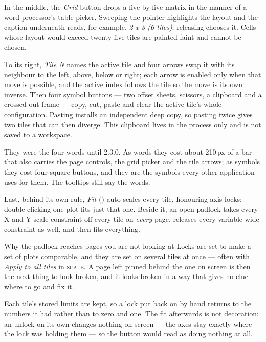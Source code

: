 \documentclass[11pt,a4paper,oneside]{report}
\newcommand{\key}[1]{\textsf{\small\fbox{#1}}}
\newcommand{\tab}[1]{\textsc{#1}}
\begin{document}
In the middle, the \emph{Grid} button drops a five-by-five matrix in the manner
of a word processor's table picker. Sweeping the pointer highlights the layout
and the caption underneath reads, for example, \emph{2 x 3 (6 tiles)}; releasing
chooses it. Cells whose layout would exceed twenty-five tiles are painted faint
and cannot be chosen.

To its right, \emph{Tile N} names the active tile and four arrows swap it with
its neighbour to the left, above, below or right; each arrow is enabled only when
that move is possible, and the active index follows the tile so the move is its
own inverse. Then four symbol buttons --- two offset sheets, scissors, a
clipboard and a crossed-out frame --- copy, cut, paste and clear the active
tile's whole configuration. Pasting installs an independent deep copy, so
pasting twice gives two tiles that can then diverge. This clipboard lives in
the process only and is not saved to a workspace.

They were the four words until 2.3.0. As words they cost about 210\,px of a bar
that also carries the page controls, the grid picker and the tile arrows; as
symbols they cost four square buttons, and they are the symbols every other
application uses for them. The tooltips still say the words.

Last, behind its own rule, \emph{Fit} (\key{Ctrl+0}) auto-scales every tile,
honouring axis locks; double-clicking one plot fits just that one. Beside it, an
open padlock takes every X and Y scale constraint off every tile on
\emph{every} page, releases every variable-wide constraint as well, and then
fits everything.

\begin{aoenote}{Why the padlock reaches pages you are not looking at}
Locks are set to make a set of plots comparable, and they are set on several
tiles at once --- often with \emph{Apply to all tiles} in \tab{scale}. A page
left pinned behind the one on screen is then the next thing to look broken, and
it looks broken in a way that gives no clue where to go and fix it.

Each tile's stored limits are kept, so a lock put back on by hand returns to the
numbers it had rather than to zero and one. The fit afterwards is not
decoration: an unlock on its own changes nothing on screen --- the axes stay
exactly where the lock was holding them --- so the button would read as doing
nothing at all.
\end{aoenote}
\end{document}
